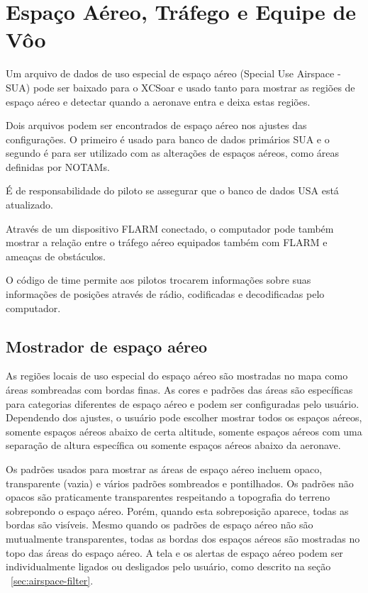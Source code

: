 \chapter{Espaço Aéreo, Tráfego e Equipe de Vôo}\label{cha:airspace}
Um arquivo de dados de uso especial de espaço aéreo (Special Use Airspace - SUA) pode ser baixado para o XCSoar e usado tanto para mostrar as regiões de espaço aéreo e detectar quando a aeronave entra e deixa estas regiões.

Dois arquivos podem ser encontrados de espaço aéreo nos ajustes das configurações.  O primeiro é usado para banco de dados primários SUA e o segundo é para ser utilizado com as alterações de espaços aéreos, como áreas definidas por NOTAMs.

É de responsabilidade do piloto se assegurar que o banco de dados USA está atualizado.

Através de um dispositivo FLARM conectado, o computador pode também mostrar a relação entre o tráfego aéreo equipados também com FLARM e ameaças de obstáculos.

O código de time permite aos pilotos trocarem informações sobre suas informações de posições através de rádio, codificadas e decodificadas pelo computador.


\section{Mostrador de espaço aéreo}

As regiões locais de uso especial do espaço aéreo são mostradas no mapa como áreas sombreadas com bordas finas.  As cores e padrões das áreas são específicas para categorias diferentes de espaço aéreo e podem ser configuradas pelo usuário.  Dependendo dos ajustes, o usuário pode escolher mostrar todos os espaços aéreos, somente espaços aéreos abaixo de certa altitude, somente espaços aéreos com uma separação de altura específica ou somente espaços aéreos abaixo da aeronave.

Os padrões usados para mostrar as áreas de espaço aéreo incluem opaco, transparente (vazia) e vários padrões sombreados e pontilhados.  Os padrões não opacos são praticamente transparentes respeitando a topografia do terreno sobrepondo o espaço aéreo.  Porém, quando esta sobreposição aparece, todas as bordas são visíveis.  Mesmo quando os padrões de espaço aéreo não são mutualmente transparentes, todas as bordas dos espaços aéreos são mostradas no topo das áreas do espaço aéreo.
A tela e os alertas de espaço aéreo podem ser individualmente ligados ou desligados pelo usuário, como descrito na seção
~\ref{sec:airspace-filter}.

